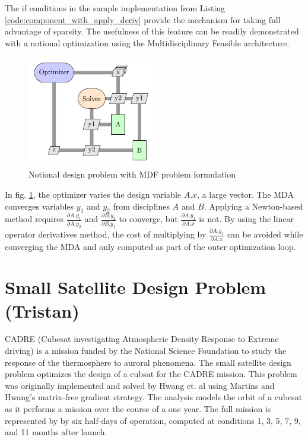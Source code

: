 \documentclass[]{aiaa-tc} %
\begin{document}
    The if conditions in the sample implementation from Listing \ref{code:component_with_apply_deriv} provide the
    mechanism for taking full advantage of sparsity. The usefulness of this feature can be readily demonstrated with
    a notional optimization using the Multidisciplinary Feasible architecture\cite{martins:arch:survey}.

    \begin{figure}[htbp]
        \centering
        \includegraphics[width=0.5\textwidth]{xdsm/mdf_sample}
        \caption{Notional design problem with MDF problem formulation}
        \label{fig:MDF:XDSM}
    \end{figure}

    In fig. \ref{fig:MDF:XDSM}, the optimizer varies the design variable $A.x$, a large vector.
    The MDA converges variables $y_1$ and $y_2$ from disciplines $A$ and $B$. Applying a
    Newton-based method requires $\frac{\partial A.y_1}{\partial A.y_2}$ and $\frac{\partial B.y_2}{\partial B.y_1}$
    to converge, but $\frac{\partial A.y_1}{\partial A.x}$ is not. By using the linear operator derivatives method,
    the cost of multiplying by $\frac{\partial A.y_1}{\partial A.x}$ can be avoided while converging the MDA and only
    computed as part of the outer optimization loop.

    \section{Small Satellite Design Problem (Tristan)}

    CADRE (Cubesat investigating Atmospheric Density Response to Extreme driving)
    is a mission funded by the National Science Foundation to study the
    response of the thermosphere to auroral phenomena\cite{cutler2011cubesat}.
    The small satellite design problem optimizes the design of a cubsat for the CADRE mission.
    This problem was originally implemented and solved by Hwang et. al\cite{CADRE2012} using
    Martins and Hwang's matrix-free gradient strategy. The analysis models the orbit of a cubesat
    as it performs a mission over the course of a one year. The full mission is represented by
    by six half-days of operation, computed at conditions 1, 3, 5, 7, 9, and 11 months after launch.
\end{document}
